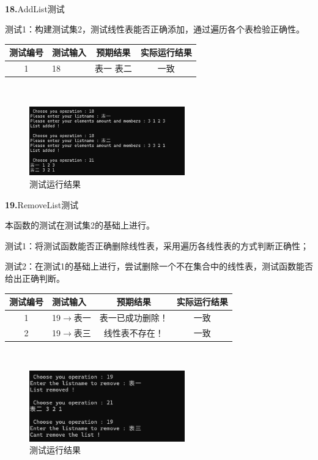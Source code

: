\documentclass[supercite]{Experimental_Report}
\theoremstyle{definition}
\begin{document}
~\

\noindent\textbf{18.}AddList测试

测试1：构建测试集2，测试线性表能否正确添加，通过遍历各个表检验正确性。

\vspace{0.5em}

\begin{tabular}{|c|p{2.7cm}|c|c|}
	\hline
	测试编号 & 测试输入 & 预期结果 & 实际运行结果 \\
	\hline
	1 & 18 & 表一 表二 & 一致 \\
	\hline
\end{tabular}

~\

 \begin{figure}[H]
 	\centering
 	\includegraphics[width=0.6\textwidth]{images/线性表测试18.png}
 	\caption{测试运行结果}
 	\label{txlab}
 \end{figure}

\noindent\textbf{19.}RemoveList测试

本函数的测试在测试集2的基础上进行。

测试1：将测试函数能否正确删除线性表，采用遍历各线性表的方式判断正确性；

测试2：在测试1的基础上进行，尝试删除一个不在集合中的线性表，测试函数能否给出正确判断。

\vspace{0.5em}

\begin{tabular}{|c|p{2.7cm}|c|c|}
	\hline
	测试编号 & 测试输入 & 预期结果 & 实际运行结果 \\
	\hline
	1 & 19$\rightarrow$表一 & 表一已成功删除！ & 一致 \\
	\hline
	2 & 19$\rightarrow$表三 & 线性表不存在！ & 一致 \\
	\hline
\end{tabular}

~\

 \begin{figure}[H]
 	\centering
 	\includegraphics[width=0.6\textwidth]{images/线性表测试19.png}
 	\caption{测试运行结果}
 	\label{txlab}
 \end{figure}
\end{document}
